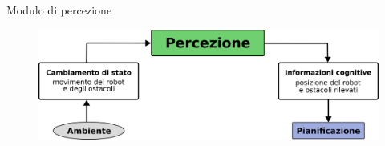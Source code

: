 \documentclass[handout]{beamer}
\begin{document}
\begin{frame}{Modulo di percezione}
\centering
\begin{figure}
\includegraphics{percezione.png}
\end{figure}
\end{frame}
\end{document}
